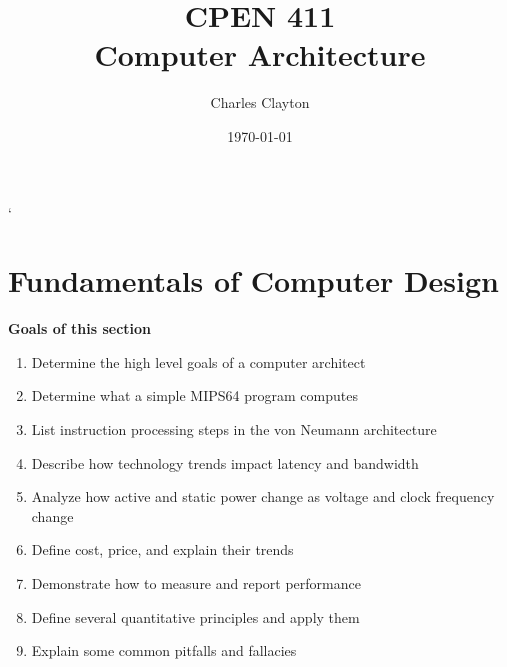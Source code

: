 \documentclass{article}
\begin{document}


\title{\huge CPEN 411 \\ \Large \medskip Computer Architecture}
\author{Charles Clayton}
\date{\today}
\maketitle
`
\thispagestyle{empty}

\setcounter{page}{0}



\singlespacing			\pagebreak
\tableofcontents		\pagebreak

\listoffigures		
\listoftables
\listofmyequations
\pagebreak



\printnoidxglossaries	\pagebreak












\newpage

\section{Fundamentals of Computer Design}

\textbf{Goals of this section}

\begin{enumerate}
\item Determine the high level goals of a computer architect
\item Determine what a simple MIPS64 program computes
\item List instruction processing steps in the von Neumann architecture
\item Describe how technology trends impact latency and bandwidth
\item Analyze how active and static power change as voltage and clock frequency change
\item Define cost, price, and explain their trends
\item Demonstrate how to measure and report performance
\item Define several quantitative principles and apply them
\item Explain some common pitfalls and fallacies
\end{enumerate}
\end{document}
